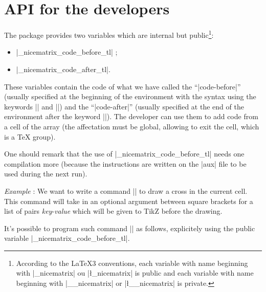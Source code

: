 \documentclass[dvipsnames]{article}%
\begin{document}

\section{API for the developers}

The package  provides two variables which are internal but
public\footnote{According to the LaTeX3 conventions,
each variable with name beginning with |\g_nicematrix| ou |\l_nicematrix| is
public and each variable with name beginning with |\g__nicematrix| or
|\l__nicematrix| is private.}: 
\begin{itemize}
\item |\g_nicematrix_code_before_tl| ;
\item |\g_nicematrix_code_after_tl|.
\end{itemize}


\medskip
These variables contain the code of what we have called the ``|code-before|''
(usually specified at the beginning of the environment with the syntax using
the keywords |\CodeBefore| and |\Body|) and the ``|code-after|'' (usually
specified at the end of the environment after the keyword |\CodeAfter|). The
developer can use them to add code from a cell of the array (the affectation
must be global, allowing to exit the cell, which is a TeX group).

\medskip
One should remark that the use of |\g_nicematrix_code_before_tl| needs one
compilation more (because the instructions are written on the |aux| file to be
used during the next run).

\bigskip
\emph{Example} : We want to write a command |\crossbox| to draw a cross in the
current cell. This command will take in an optional argument between square
brackets for a list of pairs \textsl{key}-\textsl{value} which will be given to
TikZ before the drawing.

It's possible to program such command |\crossbox| as follows, explicitely
using the public variable |\g_nicematrix_code_before_tl|.



%
\end{document}
